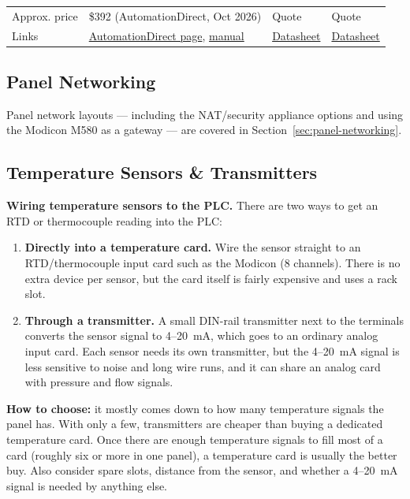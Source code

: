 \begin{longtable}{@{}P{3.22cm}P{4.00cm}P{4.00cm}P{4.00cm}@{}}
Approx. price & \$392 (AutomationDirect, Oct 2026) & Quote & Quote \\
Links & \href{https://www.automationdirect.com/adc/shopping/catalog/communications/protocol_gateways/modbus_gateways/eki-1222-ce}{AutomationDirect page}, \href{https://cdn.automationdirect.com/static/manuals/advantechmbgateway/advmbgatewayum.pdf}{manual} & \href{https://cdn.logic-control.com/docs/red-lion/Datasheets/Data\%20Stations/DA10D_and_DA30D_Datasheet.pdf}{Datasheet} & \href{https://cdn.logic-control.com/docs/red-lion/Datasheets/Data\%20Stations/DA10D_and_DA30D_Datasheet.pdf}{Datasheet} \\
\bottomrule
\end{longtable}

\subsection{Panel Networking}
Panel network layouts --- including the NAT/security appliance options and using the Modicon M580 as a gateway --- are covered in Section~\ref{sec:panel-networking}.

\subsection{Temperature Sensors \& Transmitters}\label{sec:temperature}
\textbf{Wiring temperature sensors to the PLC.} There are two ways to get an RTD or thermocouple reading into the PLC:
\begin{enumerate}[itemsep=2pt]
  \item \textbf{Directly into a temperature card.} Wire the sensor straight to an RTD/thermocouple input card such as the Modicon  (8 channels). There is no extra device per sensor, but the card itself is fairly expensive and uses a rack slot.
  \item \textbf{Through a transmitter.} A small DIN-rail transmitter next to the terminals converts the sensor signal to 4--20~mA, which goes to an ordinary analog input card. Each sensor needs its own transmitter, but the 4--20~mA signal is less sensitive to noise and long wire runs, and it can share an analog card with pressure and flow signals.
\end{enumerate}
\textbf{How to choose:} it mostly comes down to how many temperature signals the panel has. With only a few, transmitters are cheaper than buying a dedicated temperature card. Once there are enough temperature signals to fill most of a card (roughly six or more in one panel), a temperature card is usually the better buy. Also consider spare slots, distance from the sensor, and whether a 4--20~mA signal is needed by anything else.


